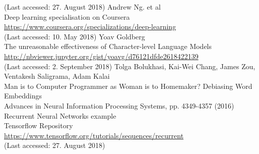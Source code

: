 \documentclass[10pt, a4paper]{UUThesisTemplate}
\begin{document}
\begin{thebibliography}{--}
    (Last accessed: 27. August 2018)
    Andrew Ng. et al\\
    Deep learning specialisation on Coursera\\
    \url{https://www.coursera.org/specializations/deep-learning}\\
    (Last accessed: 10. May 2018)
     Yoav Goldberg\\
    The unreasonable effectiveness of Character-level Language Models\\
    \url{http://nbviewer.jupyter.org/gist/yoavg/d76121dfde2618422139}\\
    (Last accessed: 2. September 2018)
     Tolga Bolukhasi, Kai-Wei Chang, James Zou, Ventakesh Saligrama, Adam Kalai\\
    Man is to Computer Programmer as Woman is to Homemaker? Debiasing Word Embeddings\\
    Advances in Neural Information Processing Systems, pp. 4349-4357 (2016)
    Recurrent Neural Networks example\\
    Tensorflow Repository\\
    \url{https://www.tensorflow.org/tutorials/sequences/recurrent}\\
    (Last accessed: 27. August 2018)

\end{thebibliography}
\end{document}
